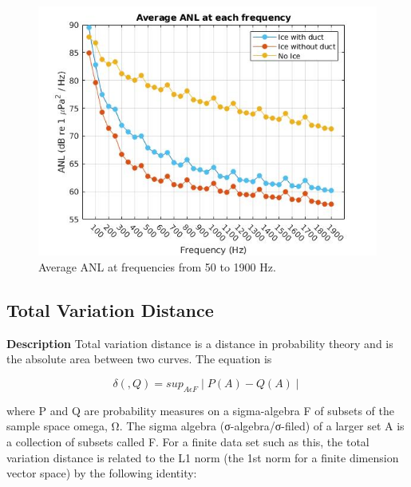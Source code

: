 \begin{figure}[H]
\centering
\includegraphics[scale=0.5]{Figures/Average_ANL_cutoff.jpg}
\caption{Average ANL at frequencies from 50 to 1900 Hz.}
\label{fig_avg_anl}
\end{figure}

\subsection{Total Variation Distance}
\textbf{Description}
Total variation distance is a distance in probability theory and is the absolute area between two curves. The equation is 

\begin{equation} \label{totalvardist}
\delta(,Q)=sup_{A\epsilon F}\mid P(A)-Q(A)\mid   
\end{equation}

where P and Q are probability measures on a sigma-algebra F of subsets of the sample space omega, Ω. The sigma algebra (σ-algebra/σ-filed) of a larger set A is a collection of subsets called F. For a finite data set such as this, the total variation distance is related to the L1 norm (the 1st norm for a finite dimension vector space) by the following identity:

